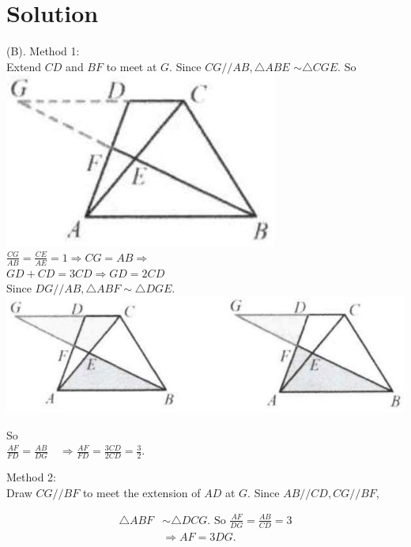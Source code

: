 \documentclass{article}
\begin{document}
\section*{Solution}
(B).
Method 1:\\
Extend \(C D\) and \(B F\) to meet at \(G\). Since \(C G / / A B, \triangle A B E\) \(\sim \triangle C G E\). So\\
\centering
\includegraphics[width=\textwidth]{images/135.jpg}\\
\(\frac{C G}{A B}=\frac{C E}{A E}=1 \Rightarrow C G=A B \Rightarrow\)\\
\(G D+C D=3 C D \Rightarrow G D=2 C D\)\\
Since \(D G / / A B, \triangle A B F \sim \triangle D G E\).\\
\centering
\includegraphics[width=\textwidth]{images/135(1).jpg}


So\\
\(\frac{A F}{F D}=\frac{A B}{D G} \quad \Rightarrow \frac{A F}{F D}=\frac{3 C D}{2 C D}=\frac{3}{2}\).

Method 2:\\
Draw \(C G / / B F\) to meet the extension of \(A D\) at \(G\). Since \(A B / / C D, C G / / B F\),

\[
\begin{aligned}
\triangle A B F & \sim \triangle D C G . \text { So } \frac{A F}{D G}=\frac{A B}{C D}=3 \\
& \Rightarrow A F=3 D G .
\end{aligned}
\]
\end{document}
